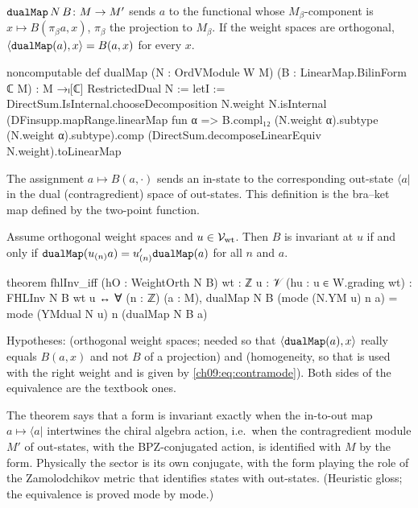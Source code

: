 \begin{definition}\label{ch09:def:dualMap}
$\lean{dualMap}\,N\,B\colon M\to M'$ sends $a$ to the functional whose $M_\beta$-component is
$x\mapsto B(\pi_\beta a,x)$, $\pi_\beta$ the projection to $M_\beta$. If the weight spaces are
orthogonal, $\langle\lean{dualMap}(a),x\rangle=B(a,x)$ for every $x$.
\end{definition}
\begin{leancode}
noncomputable def dualMap (N : OrdVModule W M) (B : LinearMap.BilinForm ℂ M) :
    M →ₗ[ℂ] RestrictedDual N :=
  letI := DirectSum.IsInternal.chooseDecomposition N.weight N.isInternal
  (DFinsupp.mapRange.linearMap fun α => B.compl₁₂ (N.weight α).subtype (N.weight α).subtype).comp
    (DirectSum.decomposeLinearEquiv N.weight).toLinearMap
\end{leancode}

\begin{physics}
The assignment $a\mapsto B(a,\cdot)$ sends an in-state to the corresponding out-state $\langle a|$ in the dual (contragredient) space of out-states. This definition is the bra--ket map defined by the two-point function.
\end{physics}

\begin{theorem}\label{ch09:thm:fhlInviff}
Assume orthogonal weight spaces and $u\in\mathcal{V}_{\mathrm{wt}}$. Then $B$ is invariant at $u$ if
and only if $\lean{dualMap}(u_{(n)}a)=u'_{(n)}\lean{dualMap}(a)$ for all $n$ and $a$.
\end{theorem}
\begin{leancode}
theorem fhlInv_iff (hO : WeightOrth N B) {wt : ℤ} {u : 𝒱} (hu : u ∈ W.grading wt) :
    FHLInv N B wt u ↔
      ∀ (n : ℤ) (a : M), dualMap N B (mode (N.YM u) n a) = mode (YMdual N u) n (dualMap N B a)
\end{leancode}
\begin{dictionary}
Hypotheses:  (orthogonal weight spaces; needed so that $\langle\lean{dualMap}(a),x\rangle$
really equals $B(a,x)$ and not $B$ of a projection) and  (homogeneity, so that
 is used with the right weight and  is given by
\eqref{ch09:eq:contramode}). Both sides of the equivalence are the textbook ones.
\end{dictionary}
\begin{physics}
The theorem says that a form is invariant exactly when the in-to-out map $a\mapsto\langle a|$ intertwines the chiral algebra action, i.e.\ when the contragredient module $M'$ of out-states, with the BPZ-conjugated action, is identified with $M$ by the form. Physically the sector is its own conjugate, with the form playing the role of the Zamolodchikov metric that identifies states with out-states. (Heuristic gloss; the equivalence is proved mode by mode.)
\end{physics}


